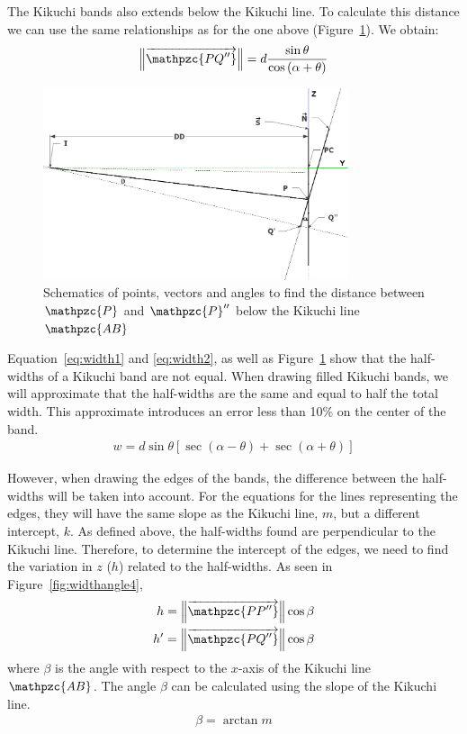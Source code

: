 \documentclass[letterpaper]{article}
\newcommand{\norm}[1]{\left\|#1\right\|}
\newcommand{\var}[1]{\mathpzc{#1}}
\begin{document}
	The Kikuchi bands also extends below the Kikuchi line. To calculate this distance we can use the same relationships as for the one above (Figure~\ref{fig:widthangle3}). 
	We obtain:
	\begin{eqnarray}
		\norm{\overrightarrow{\var{PQ^{\prime\prime}}}} = d \frac{\sin{\theta}}{\cos{\left(\alpha + \theta\right)}}
		\label{eq:width2}
	\end{eqnarray}
	
	\begin{figure}
		\centering
		\includegraphics[width=0.8\textwidth]{figures/widthangle3}
		\caption{Schematics of points, vectors and angles to find the distance between $\var{P}$ and $\var{P}^{\prime\prime}$ below the Kikuchi line $\var{AB}$}
		\label{fig:widthangle3}
	\end{figure}
	
	Equation~\ref{eq:width1} and \ref{eq:width2}, as well as Figure~\ref{fig:widthangle3} show that the half-widths of a Kikuchi band are not equal.
	When drawing filled Kikuchi bands, we will approximate that the half-widths are the same and equal to half the total width. 
	This approximate introduces an error less than 10\% on the center of the band.
	\begin{eqnarray}
		w = d \sin{\theta} \left[\sec{\left(\alpha - \theta\right)} + \sec{\left(\alpha + \theta\right)}\right]
		\label{eq:totalwidth}
	\end{eqnarray}
	
	However, when drawing the edges of the bands, the difference between the half-widths will be taken into account.
	For the equations for the lines representing the edges, they will have the same slope as the Kikuchi line, $m$, but a different intercept, $k$.
	As defined above, the half-widths found are perpendicular to the Kikuchi line. 
	Therefore, to determine the intercept of the edges, we need to find the variation in $z$ ($h$) related to the half-widths.
	As seen in Figure~\ref{fig:widthangle4}, 
	\begin{eqnarray}
		h = \norm{\overrightarrow{\var{PP^{\prime\prime}}}} \cos\beta\\
		h^\prime = \norm{\overrightarrow{\var{PQ^{\prime\prime}}}} \cos\beta
		\label{eq:height1}
	\end{eqnarray}
	where $\beta$ is the angle with respect to the $x$-axis of the Kikuchi line $\var{AB}$.
	The angle $\beta$ can be calculated using the slope of the Kikuchi line.
	\begin{eqnarray}
		\beta = \arctan{m}
		\label{eq:beta}
	\end{eqnarray}
	
\end{document}
